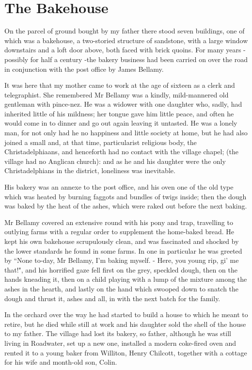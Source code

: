 \chapter{The Bakehouse}

On the parcel of ground bought by my father there stood seven buildings, one of which was a bakehouse, a two-storied structure of sandstone, with a large window downstairs and a loft door above, both faced with brick quoins. For many years - possibly for half a century -the bakery business had been carried on over the road in conjunction with the post office by James Bellamy.

It was here that my mother came to work at the age of sixteen as a clerk and telegraphist. She remembered Mr Bellamy was a kindly, mild-mannered old gentleman with pince-nez. He was a widower with one daughter who, sadly, had inherited little of his mildness; her tongue gave him little peace, and often he would come in to dinner and go out again leaving it untasted. He was a lonely man, for not only had he no happiness and little society at home, but he had also joined a small and, at that time, particularist religious body, the Christadelphiaans, and henceforth had no contact with the village chapel; (the village had no Anglican church): and as he and his daughter were the only Christadelphians in the district, loneliness was inevitable.

His bakery was an annexe to the post office, and his oven one of the old type which was heated by burning faggots and bundles of twigs inside; then the dough was baked by the heat of the ashes, which were raked out before the next baking.

Mr Bellamy covered an extensive round with his pony and trap, travelling to outlying farms with a regular order to supplement the home-baked bread. He kept his own bakehouse scrupulously clean, and was fascinated and shocked by the lower standards he found in some farms. In one in particular he was greeted by “None to-day, Mr Bellamy, I'm baking myself. - Here, you young rip, gi' me that!", and his horrified gaze fell first on the grey, speckled dough, then on the hands kneading it, then on a child playing with a lump of the mixture among the ashes in the hearth, and lastly on the hand which swooped down to snatch the dough and thrust it, ashes and all, in with the next batch for the family.

In the orchard over the way he had started to build a house to which he meant to retire, but he died while still at work and his daughter sold the shell of the house to my father. The village had lost its bakery, so father, although he was still living in Roadwater, set up a new one, installed a modern coke-fired oven and rented it to a young baker from Williton, Henry Chilcott, together with a cottage for his wife and month-old son, Colin.

